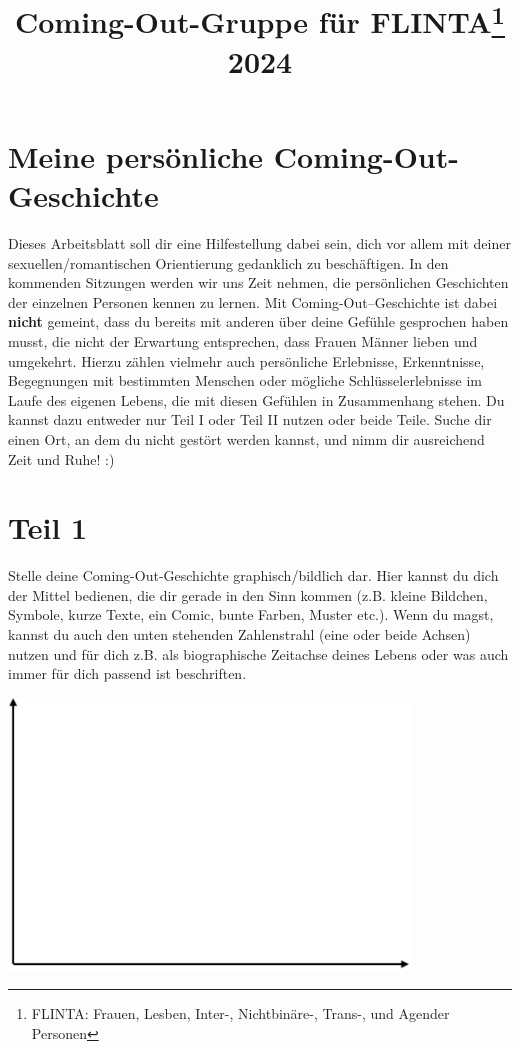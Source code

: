 \documentclass[a4paper,12pt]{article}
\title{Coming-Out-Gruppe für FLINTA\footnote{FLINTA: Frauen, Lesben, Inter-, Nichtbinäre-, Trans-, und Agender Personen} 2024}
\author{}
\date{}
\begin{document}
\maketitle

\section*{Meine persönliche Coming-Out-Geschichte}

Dieses Arbeitsblatt soll dir eine Hilfestellung dabei sein, dich vor allem mit deiner sexuellen/romantischen Orientierung gedanklich zu beschäftigen.  
In den kommenden Sitzungen werden wir uns Zeit nehmen, die persönlichen Geschichten der einzelnen Personen kennen zu lernen.  
Mit Coming-Out–Geschichte ist dabei \textbf{nicht} gemeint, dass du bereits mit anderen über deine Gefühle gesprochen haben musst, die nicht der Erwartung entsprechen, dass Frauen Männer lieben und umgekehrt.  
Hierzu zählen vielmehr auch persönliche Erlebnisse, Erkenntnisse, Begegnungen mit bestimmten Menschen oder mögliche Schlüsselerlebnisse im Laufe des eigenen Lebens, die mit diesen Gefühlen in Zusammenhang stehen.  
Du kannst dazu entweder nur Teil I oder Teil II nutzen oder beide Teile.  
Suche dir einen Ort, an dem du nicht gestört werden kannst, und nimm dir ausreichend Zeit und Ruhe! :)

\section*{Teil 1}

Stelle deine Coming-Out-Geschichte graphisch/bildlich dar. Hier kannst du dich der Mittel bedienen, die dir gerade in den Sinn kommen (z.B. kleine Bildchen, Symbole, kurze Texte, ein Comic, bunte Farben, Muster etc.). Wenn du magst, kannst du auch den unten stehenden Zahlenstrahl (eine oder beide Achsen) nutzen und für dich z.B. als biographische Zeitachse deines Lebens oder was auch immer für dich passend ist beschriften.

\begin{center}
    \includegraphics[width=0.8\textwidth]{zeitreihe.png}
\end{center}
\end{document}
